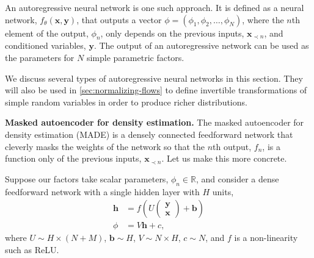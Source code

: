 An autoregressive neural network is one such approach. It is defined as a neural network, $f_\theta(\mathbf{x},\mathbf{y})$, that outputs a vector $\phi=(\phi_1,\phi_2,\ldots,\phi_N)$, where the $n$th element of the output, $\phi_n$, only depends on the previous inputs, $\mathbf{x}_{\prec n}$, and conditioned variables, $\mathbf{y}$. The output of an autoregressive network can be used as the parameters for $N$ simple parametric factors.

We discuss several types of autoregressive neural networks in this section. They will also be used in \ref{sec:normalizing-flows} to define invertible transformations of simple random variables in order to produce richer distributions.


{\bfseries Masked autoencoder for density estimation.} The masked autoencoder for density estimation (MADE) \citep{GermainEtAl2015} is a densely connected feedforward network that cleverly masks the weights of the network so that the $n$th output, $f_n$, is a function only of the previous inputs, $\mathbf{x}_{\prec n}$. Let us make this more concrete.

Suppose our factors take scalar parameters, $\phi_n\in\mathbb{R}$, and consider a dense feedforward network with a single hidden layer with $H$ units,
\begin{align*}
	\mathbf{h} &= f\left(U\begin{pmatrix}\mathbf{y}\\\mathbf{x}\end{pmatrix} + \mathbf{b}\right)\\
	\phi &= V\mathbf{h}+c,
\end{align*}
where $U\sim H\times(N+M)$, $\mathbf{b}\sim H$, $V\sim N\times H$, $c\sim N$, and $f$ is a non-linearity such as ReLU.


